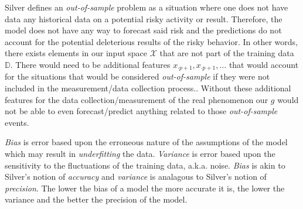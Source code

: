 \documentclass[12pt]{article}
\begin{document}
\begin{enumerate}
\begin{tcolorbox}[colback=white, sharp corners]
\end{tcolorbox}


\begin{tcolorbox}[colback=white, sharp corners]

Silver defines an \emph{out-of-sample} problem as a situation where one does not have data any historical data on a potential risky activity or result. Therefore, the model does not have any way to forecast said risk and the predictions do not account for the potential deleterious results of the risky behavior. In other words, there exists elements in our input space $\mathcal{X}$ that are not part of the training data $\mathbb{D}$. There would need to be additional features $x_{\cdot p+1}, x_{\cdot p+1}, \ldots $ that would account for the situations that would be considered \emph{out-of-sample} if they were not included in the measurement/data collection process.. Without these additional features for the data collection/measurement of the real phenomenon our $g$ would not be able to even forecast/predict anything related to those \emph{out-of-sample} events. 
\end{tcolorbox}


\begin{tcolorbox}[colback=white, sharp corners]
\emph{Bias} is error based upon the erroneous nature of the assumptions of the model which may result in \emph{underfitting} the data. \emph{Variance} is error based upon the sensitivity to the fluctuations of the training data, a.k.a. noise.
\emph{Bias} is akin to Silver's notion of \emph{accuracy} and \emph{variance} is analagous to Silver's notion of \emph{precision}. The lower the bias of a model the more accurate it is, the lower the variance and the better the precision of the model. 


\end{tcolorbox}
\end{enumerate}
\end{document}
